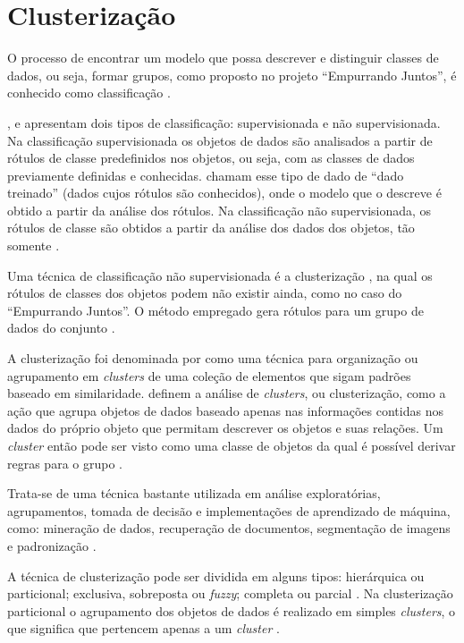 \chapter{Clusterização} \label{cap:clusterizacao}

O processo de encontrar um modelo que possa descrever e distinguir classes de dados, ou seja, formar 
grupos, como proposto no projeto ``Empurrando Juntos'', é conhecido como classificação \cite{han2011data}.

,  e  apresentam dois tipos de 
classificação: supervisionada e não supervisionada.
Na classificação supervisionada os objetos de dados são analisados a partir de rótulos de classe predefinidos nos objetos, ou seja, 
com as classes de dados previamente definidas e conhecidas.  chamam esse tipo de dado de ``dado treinado''
(dados cujos rótulos são conhecidos), onde o modelo que o descreve é obtido a partir da análise dos rótulos.
Na classificação não supervisionada, os rótulos de classe são obtidos a partir da análise dos dados dos objetos, tão somente \cite{tan2013data}.

Uma técnica de classificação não supervisionada é a clusterização \cite{clustering_review, tan2013data}, na qual os rótulos de classes dos objetos 
podem não existir ainda, como no caso do ``Empurrando Juntos''. O método empregado gera rótulos para um grupo de dados do conjunto \cite{han2011data}. 

A clusterização foi denominada por  como uma técnica para organização ou agrupamento em \textit{clusters} 
de uma coleção de elementos que sigam padrões baseado em similaridade.
 definem a análise de \textit{clusters}, ou clusterização, como a ação que agrupa objetos de dados
baseado apenas nas informações contidas nos dados do próprio objeto que permitam descrever os objetos e suas relações. Um \textit{cluster}
então pode ser visto como uma classe de objetos da qual é possível derivar regras para o grupo \cite{han2011data}.

Trata-se de uma técnica bastante utilizada em análise exploratórias, agrupamentos, 
tomada de decisão e implementações de aprendizado de máquina, como:
mineração de dados, recuperação de documentos, segmentação de imagens e padronização \cite{clustering_review}.

A técnica de clusterização pode ser dividida em alguns tipos: hierárquica ou particional; exclusiva, sobreposta ou \textit{fuzzy}; 
completa ou parcial \cite{tan2013data, clustering_review}. Na clusterização particional o agrupamento dos 
objetos de dados é realizado em simples \textit{clusters}, o que significa que pertencem apenas a um \textit{cluster} \cite{tan2013data}.

